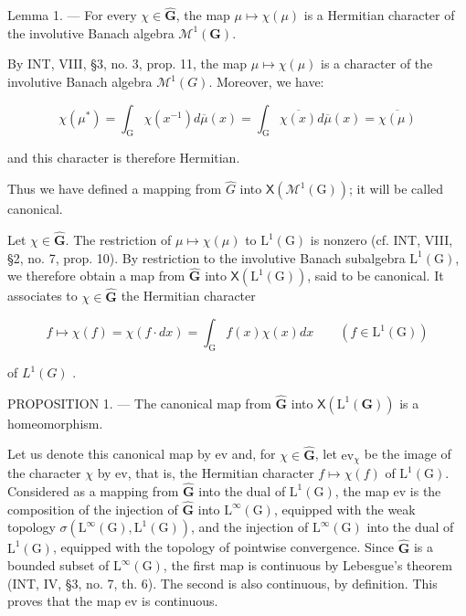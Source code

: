 Lemma 1. --- For every \(\chi \in \widehat{\mathbf{G}}\), the map \(\mu \mapsto \chi(\mu)\) is a Hermitian character of the involutive Banach algebra \(\mathcal{M}^1(\mathbf{G})\).

By INT, VIII, §3, no. 3, prop. 11, the map \(\mu \mapsto \chi(\mu)\) is a character of the involutive Banach algebra \(\mathcal{M}^{1}(G)\). Moreover, we have:

\[
\chi (\mu^ {*}) = \int_ {\mathrm{G}} \chi (x ^ {- 1}) d \overline {{\mu}} (x) = \int_ {\mathrm{G}} \overline {{\chi (x)}} d \overline {{\mu}} (x) = \overline {{\chi (\mu)}}
\]

and this character is therefore Hermitian.

Thus we have defined a mapping from \(\widehat{G}\) into \(\mathsf{X}(\mathcal{M}^{1}(\mathrm{G}))\); it will be called canonical.

Let \(\chi \in \widehat{\mathbf{G}}\). The restriction of \(\mu \mapsto \chi(\mu)\) to \(\mathrm{L}^1(\mathrm{G})\) is nonzero (cf. INT, VIII, §2, no. 7, prop. 10). By restriction to the involutive Banach subalgebra \(\mathrm{L}^1(\mathrm{G})\), we therefore obtain a map from \(\widehat{\mathbf{G}}\) into \(\mathsf{X}(\mathrm{L}^1(\mathrm{G}))\), said to be canonical. It associates to \(\chi \in \widehat{\mathbf{G}}\) the Hermitian character

\[
f \mapsto \chi (f) = \chi (f \cdot d x) = \int_ {\mathrm{G}} f (x) \chi (x) d x \qquad (f \in \mathrm{L} ^ {1} (\mathrm{G}))\tag{2}
\]

of \(L^{1}(G)\) .

PROPOSITION 1. --- The canonical map from \(\widehat{\mathbf{G}}\) into \(\mathsf{X}(\mathrm{L}^{1}(\mathbf{G}))\) is a homeomorphism.

Let us denote this canonical map by ev and, for \(\chi \in \widehat{\mathbf{G}}\), let \(\mathrm{ev}_{\chi}\) be the image of the character \(\chi\) by ev, that is, the Hermitian character \(f \mapsto \chi(f)\) of \(\mathrm{L}^1(\mathrm{G})\). Considered as a mapping from \(\widehat{\mathbf{G}}\) into the dual of \(\mathrm{L}^1(\mathrm{G})\), the map ev is the composition of the injection of \(\widehat{\mathbf{G}}\) into \(\mathrm{L}^{\infty}(\mathrm{G})\), equipped with the weak topology \(\sigma(\mathrm{L}^{\infty}(\mathrm{G}), \mathrm{L}^{1}(\mathrm{G}))\), and the injection of \(\mathrm{L}^{\infty}(\mathrm{G})\) into the dual of \(\mathrm{L}^1(\mathrm{G})\), equipped with the topology of pointwise convergence. Since \(\widehat{\mathbf{G}}\) is a bounded subset of \(\mathrm{L}^{\infty}(\mathrm{G})\), the first map is continuous by Lebesgue's theorem (INT, IV, §3, no. 7, th. 6). The second is also continuous, by definition. This proves that the map ev is continuous.


